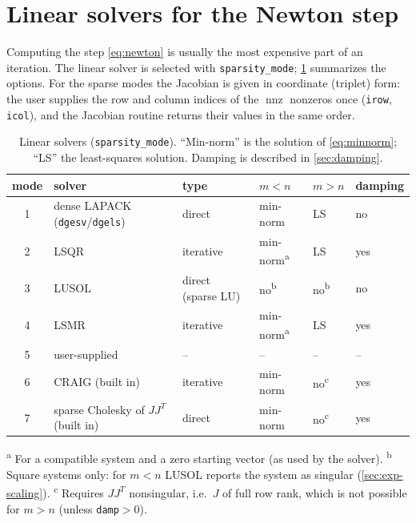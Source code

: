 \documentclass[11pt]{article}
\newcommand{\code}[1]{\texttt{#1}}
\DeclareMathOperator{\nnz}{nnz}
\begin{document}
\section{Linear solvers for the Newton step}
\label{sec:linear}

Computing the step \cref{eq:newton} is usually the most expensive part of an iteration.
The linear solver is selected with \code{sparsity\_mode}; \cref{tab:solvers} summarizes the
options. For the sparse modes the Jacobian is given in coordinate (triplet) form: the user
supplies the row and column indices of the $\nnz$ nonzeros once (\code{irow}, \code{icol}), and the
Jacobian routine returns their values in the same order.

\begin{table}[htbp]
\centering
\caption{Linear solvers (\code{sparsity\_mode}). ``Min-norm'' is the solution of \cref{eq:minnorm};
``LS'' the least-squares solution. Damping is described in \cref{sec:damping}.}
\label{tab:solvers}
\small
\begin{tabular}{@{}clllll@{}}
\toprule
mode & solver & type & $m<n$ & $m>n$ & damping \\
\midrule
1 & dense LAPACK (\code{dgesv}/\code{dgels}) & direct & min-norm & LS & no \\
2 & LSQR \cite{lsqr} & iterative & min-norm\textsuperscript{a} & LS & yes \\
3 & LUSOL \cite{lusol} & direct (sparse LU) & no\textsuperscript{b} & no\textsuperscript{b} & no \\
4 & LSMR \cite{lsmr} & iterative & min-norm\textsuperscript{a} & LS & yes \\
5 & user-supplied & -- & -- & -- & -- \\
6 & CRAIG (built in) & iterative & min-norm & no\textsuperscript{c} & yes \\
7 & sparse Cholesky of $JJ^T$ (built in) & direct & min-norm & no\textsuperscript{c} & yes \\
\bottomrule
\end{tabular}

\vspace{0.3em}
\begin{minipage}{0.9\textwidth}\footnotesize
\textsuperscript{a} For a compatible system and a zero starting vector (as used by the solver).\quad
\textsuperscript{b} Square systems only: for $m<n$ LUSOL reports the system as singular
(\cref{sec:exp-scaling}).\quad
\textsuperscript{c} Requires $J J^T$ nonsingular, i.e.\ $J$ of full row rank, which is not possible
for $m>n$ (unless \code{damp}${}>0$).
\end{minipage}
\end{table}
\end{document}
